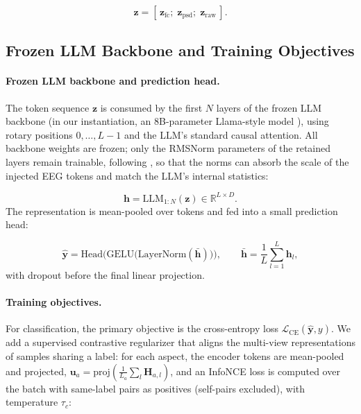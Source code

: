 \begin{equation}
  \mathbf{z} = [\,\mathbf{z}_{\mathrm{fc}};\; \mathbf{z}_{\mathrm{psd}};\;
                 \mathbf{z}_{\mathrm{raw}}\,].
\end{equation}

\subsection{Frozen LLM Backbone and Training Objectives}
\label{sec:method-objectives}

\paragraph{Frozen LLM backbone and prediction head.}
The token sequence $\mathbf{z}$ is consumed by the first $N$ layers of the
frozen LLM backbone (in our instantiation, an 8B-parameter Llama-style model
), using rotary positions $0, \dots, L-1$ and the
LLM's standard causal attention. All backbone weights are frozen; only the
RMSNorm parameters of the retained layers remain trainable, following
, so that the norms can absorb the scale of the injected EEG
tokens and match the LLM's internal statistics:

\begin{equation}
  \mathbf{h} = \mathrm{LLM}_{1:N}(\mathbf{z}) \in \mathbb{R}^{L \times D}.
\end{equation}
The representation is mean-pooled over tokens and fed into a small
prediction head:

\begin{equation}
  \hat{\mathbf{y}} = \mathrm{Head}\Big(
    \mathrm{GELU}\big(\mathrm{LayerNorm}(\bar{\mathbf{h}})\big)\Big),
  \qquad \bar{\mathbf{h}} = \frac{1}{L} \sum_{l=1}^{L} \mathbf{h}_l ,
\end{equation}
with dropout before the final linear projection.

\paragraph{Training objectives.}
For classification, the primary objective is the cross-entropy loss
$\mathcal{L}_{\mathrm{CE}}(\hat{\mathbf{y}}, y)$. We add a supervised
contrastive regularizer  that aligns the multi-view
representations of samples sharing a label: for each aspect, the encoder
tokens are mean-pooled and projected,
$\mathbf{u}_a = \mathrm{proj}(\frac{1}{L_a}\sum_l \mathbf{H}_{a,l})$, and an
InfoNCE loss is computed over the batch with same-label pairs as positives
(self-pairs excluded), with temperature $\tau_c$:


